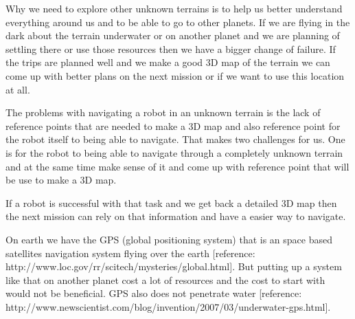 Why we need to explore other unknown terrains is to help us better understand everything around us and to be able to go to other planets. If we are flying in the dark about the terrain underwater or on another planet and we are planning of settling there or use those resources then we have a bigger change of failure. If the trips are planned well and we make a good 3D map of the terrain we can come up with better plans on the next mission or if we want to use this location at all. 

The problems with navigating a robot in an unknown terrain is the lack of reference points that are needed to make a 3D map and also reference point for the robot itself to being able to navigate. That makes two challenges for us. One is for the robot to being able to navigate through a completely unknown terrain and at the same time make sense of it and come up with reference point that will be use to make a 3D map.

If a robot is successful with that task and we get back a detailed 3D map then the next mission can rely on that information and have a easier way to navigate. 

On earth we have the GPS (global positioning system) that is an space based satellites navigation system flying over the earth [reference: http://www.loc.gov/rr/scitech/mysteries/global.html]. But putting up a system like that on another planet cost a lot of resources and the cost to start with would not be beneficial. GPS also does not penetrate water [reference: http://www.newscientist.com/blog/invention/2007/03/underwater-gps.html]. 











